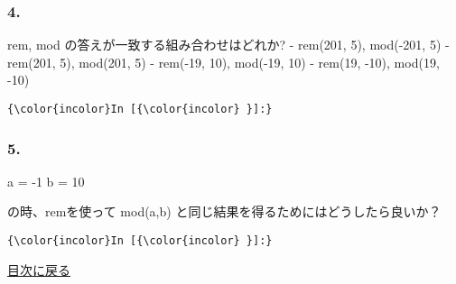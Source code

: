 \documentclass[a4paper,dvipdfmx,uplatex]{jsarticle}
\newenvironment{Shaded}{}{}
\newcommand{\FloatTok}[1]{\textcolor[rgb]{0.25,0.63,0.44}{{#1}}}
\newcommand{\NormalTok}[1]{{#1}}
\begin{document}
    \subsubsection{4.}\label{section}

rem, mod の答えが一致する組み合わせはどれか? - rem(201, 5), mod(-201, 5)
- rem(201, 5), mod(201, 5) - rem(-19, 10), mod(-19, 10) - rem(19, -10),
mod(19, -10)

    \begin{Verbatim}[commandchars=\\\{\}]
{\color{incolor}In [{\color{incolor} }]:} 
\end{Verbatim}

    \subsubsection{5.}\label{section}

\begin{Shaded}
\begin{Highlighting}[]
\NormalTok{a = -}\FloatTok{1}
\NormalTok{b = }\FloatTok{10}
\end{Highlighting}
\end{Shaded}

の時、remを使って mod(a,b) と同じ結果を得るためにはどうしたら良いか？

    \begin{Verbatim}[commandchars=\\\{\}]
{\color{incolor}In [{\color{incolor} }]:} 
\end{Verbatim}

    \protect\hyperlink{ux76eeux6b21}{目次に戻る}


    
    
    
    
\end{document}
